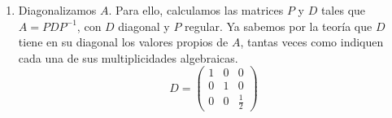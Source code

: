 \documentclass[11pt, a4paper]{article}
\newif\IfInSansMode
\numberwithin{equation}{section}
\theoremstyle{theorem-style}
\theoremstyle{definition-style}
\theoremstyle{remark-style}
\theoremstyle{example-style}
\newenvironment{nlist}
{\begin{enumerate}
    \renewcommand\labelenumi{(\emph{\roman{enumi})}}}
  {\end{enumerate}}
\begin{document}
\begin{nlist}
  Es un subespacio de dimensión 2, luego $\sigma_1 = 2$. Como $1\le\sigma_2\le m_2 = 1$, tenemos que $\sigma_2=1$, y coinciden las multiplicidades geométrica y aritmética de todos los valores propios de $A$. Por tanto, ya sabemos que \textbf{es diagonalizable} 

  Ahora, calculamos una base del subespacio propio restante:

  $$\left(A - \frac{1}{2}I\right)v = 0 \implies 
  \begin{pmatrix}
    \frac{1}{2} & \frac{1}{4} & 0 \\
    0 & 0 & 0 \\
    0 & \frac{1}{4} & \frac{1}{2}
  \end{pmatrix}
  \begin{pmatrix}
    v_1 \\
    v_2 \\
    v_3
  \end{pmatrix} =
  \begin{pmatrix}
    0 \\ 
    0 \\
    0
  \end{pmatrix} \Rightarrow
  \begin{cases}
    \frac{1}{2}v_1 + \frac{1}{4}v_2 = 0 \\
    \frac{1}{4}v_2 + \frac{1}{2}v_3 = 0
  \end{cases} \Rightarrow
  \begin{cases}
    2v_1 = -v_2 \\
    v_1 = v_3
  \end{cases}$$

  Luego, $\mathcal V_{\lambda_2} = \mathcal V_{\frac{1}{2}} = \{ v \in \mathbb C^3 : v_1 = v_3,\ 2v_1 = -v_2 \} =
  \langle\
  \begin{pmatrix}
    1 \\
    -2 \\
    1
  \end{pmatrix}\ \rangle$.

\item Diagonalizamos $A$. Para ello, calculamos las matrices $P$ y $D$ tales que $A = PDP^{-1}$, con $D$ diagonal y $P$ regular. Ya sabemos por la teoría que $D$ tiene en su diagonal los valores propios de $A$, tantas veces como indiquen cada una de sus multiplicidades algebraicas.
$$D =
\begin{pmatrix}
  1 & 0 & 0 \\
  0 & 1 & 0 \\
  0 & 0 & \frac{1}{2} 
\end{pmatrix}$$


\end{nlist}
\end{document}
